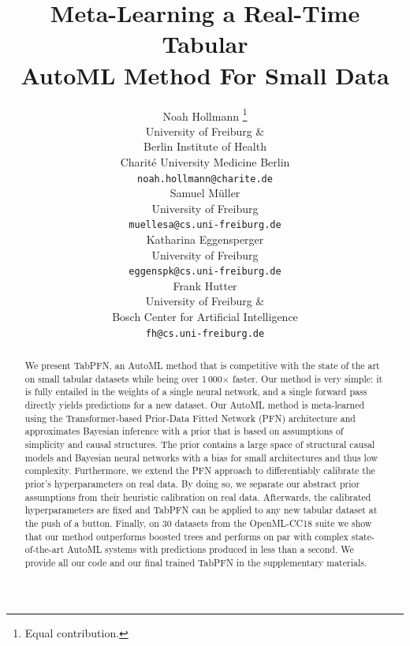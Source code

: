 \documentclass{article}
\title{Meta-Learning a Real-Time Tabular \\ AutoML Method For Small Data}
\author{
  Noah Hollmann \thanks{Equal contribution.} \\
  University of Freiburg \&\\
  Berlin Institute of Health \\
  Charit\'e University Medicine Berlin \\
  \texttt{noah.hollmann@charite.de} \\
  \And
  Samuel M\"uller \printfnsymbol{1} \\
  University of Freiburg \\
  \texttt{muellesa@cs.uni-freiburg.de} \\
  \And
  Katharina Eggensperger \\
  University of Freiburg \\
  \texttt{eggenspk@cs.uni-freiburg.de} \\
  \And
  Frank Hutter \\
  University of Freiburg \&\\
  Bosch Center for Artificial Intelligence \\
  \texttt{fh@cs.uni-freiburg.de} \\
}
\begin{document}
\maketitle


\newcommand{\methodname}[0]{TabPFN}
\newcommand{\priortuning}[0]{differentiable hyperparameter tuning}
\newcommand{\openmlcc}[0]{OpenML-CC18}
\newcommand{\openmlautoml}[0]{OpenML-AutoML}
\begin{abstract}
We present \methodname{}, an AutoML method that is competitive with the state of the art on small tabular datasets while being over 1\,000$\times$ faster. 
Our method is very simple: it is fully entailed in the weights of a single neural network, and a single forward pass directly yields predictions for a new dataset.
Our AutoML method is meta-learned using the Transformer-based Prior-Data Fitted Network (PFN) architecture and approximates Bayesian inference with a prior that is based on assumptions of simplicity and causal structures. The prior contains a large space of structural causal models and Bayesian neural networks with a bias for small architectures and thus low complexity.
Furthermore, we extend the PFN approach to differentiably calibrate the prior's hyperparameters on real data.
By doing so, we separate our abstract prior assumptions from their heuristic calibration on real data.
Afterwards, the calibrated hyperparameters are fixed and \methodname{} can be applied to any new tabular dataset at the push of a button.
Finally, on 30 datasets from the \openmlcc{} suite we show that our method outperforms boosted trees and performs on par with complex state-of-the-art AutoML systems with predictions produced in less than a second.
We provide all our code and our final trained \methodname{} in the supplementary materials.

\end{abstract}

\end{document}
